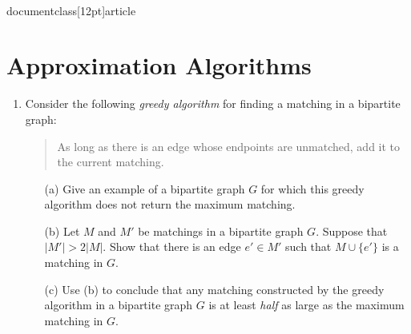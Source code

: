 \\documentclass[12pt]{article}
\begin{document}
\begin{enumerate}
{}





\end{enumerate}

\section{Approximation Algorithms}


\begin{enumerate}


\item

Consider the following {\em greedy algorithm} for finding
a matching in a bipartite graph:
\begin{quote}
As long as there is an edge whose endpoints are unmatched,
add it to the current matching.
\end{quote}
\begin{itemize}
\item[(a)] Give an example of a bipartite graph $G$
for which this greedy algorithm does not return 
the maximum matching.
\item[(b)] Let $M$ and $M'$ be matchings in a bipartite graph $G$.
Suppose that $|M'| > 2 |M|$.  Show that there is an edge
$e' \in M'$ such that $M \cup \{e'\}$ is a matching in $G$.
\item[(c)] Use (b) to conclude that any matching constructed
by the greedy algorithm in a bipartite graph $G$
is at least {\em half} as large as the maximum matching in $G$.
\end{itemize}

\end{enumerate}
\end{document}

